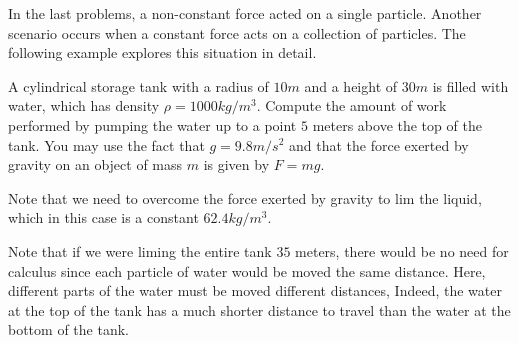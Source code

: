 \documentclass{ximera}
\begin{document}
In the last problems, a non-constant force acted on a single particle.  Another scenario occurs when a constant force acts on a collection of particles.  The following example explores this situation in detail.

\begin{model}
  A cylindrical storage tank with a radius of $10 \unit{m}$ and a height of $30\unit{m}$ is filled with water, which has density
$\rho=1000 \unit{kg}/\unit{m}^3$. Compute the amount of work performed by pumping the water up to a point $5$ meters above the top of the tank.  You may use the fact that $g=9.8m/s^2$ and that the force exerted by gravity on an object of mass $m$ is given by $F=mg$.
  \begin{explanation}
  

Note that we need to overcome the force exerted by gravity to lim the liquid, which in this case is a constant $62.4 \unit{kg}/\unit{m}^3$.

\begin{multipleChoice}
\end{multipleChoice}

Note that if we were liming the entire tank $35$ meters, there would be no need for calculus since each particle of water would be moved the same distance.  Here, different parts of the water must be moved different distances,  Indeed,  the water at the top of the tank has a much shorter distance to travel than the water at the bottom of the tank.
	

\end{explanation}
\end{model}
\end{document}
